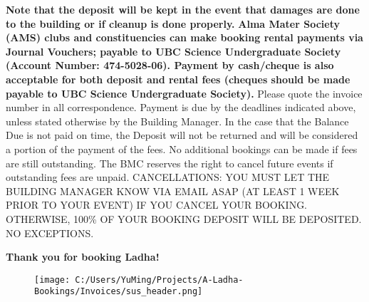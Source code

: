 \documentclass{article}%
\begin{document}
\newline%
\newline%
\textbf{Note that the deposit will be kept in the event that damages are done to the building                             or if cleanup is done properly.}%
\newline%
\newline%
\textbf{Alma Mater Society (AMS) clubs and constituencies         can make booking rental payments via Journal Vouchers; payable to UBC Science Undergraduate Society         (Account Number: 474{-}5028{-}06). Payment by cash/cheque is also acceptable for both deposit and rental fees         (cheques should be made payable to UBC Science Undergraduate Society).}%
\newline%
\newline%
Please quote the invoice number in all correspondence.         Payment is due by the deadlines indicated above, unless stated otherwise by the Building Manager.         In the case that the Balance Due is not paid on time, the Deposit will not be returned         and will be considered a portion of the payment of the fees. No additional bookings can be made if fees are still outstanding.         The BMC reserves the right to cancel future events if outstanding fees are unpaid.%
\newline%
\newline%
CANCELLATIONS:  YOU MUST LET THE BUILDING MANAGER KNOW VIA EMAIL ASAP         (AT LEAST 1 WEEK PRIOR TO YOUR EVENT) IF YOU CANCEL YOUR BOOKING.         OTHERWISE, 100\% OF YOUR BOOKING DEPOSIT WILL BE DEPOSITED. NO EXCEPTIONS.%
\newline%
\begin{center}%
\textbf{Thank you for booking Ladha!}%
\end{center}%
\newpage%


\begin{figure}[h!]%
\centering%
\centering%
\texttt{[image: C:/Users/YuMing/Projects/A-Ladha-Bookings/Invoices/sus\_header.png]}%
\end{figure}
\end{document}
